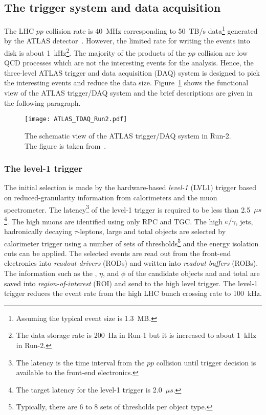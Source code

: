 
\subsection{The trigger system and data acquisition}
\label{subsec:ae_trigger}
The LHC $pp$ collision rate is 40~MHz corresponding to 50~TB/s data\footnote{Assuming the typical event size is 1.3~MB.} generated by the ATLAS detector~\cite{Kordas:2007zz}.
However, the limited rate for writing the events into disk is about 1~kHz\footnote{The data storage rate is 200~Hz in Run-1 but it is increased to about 1~kHz in Run-2.}.
The majority of the products of the $pp$ collision are low \pt QCD processes which are not the interesting events for the analysis.  
Hence, the three-level ATLAS trigger and data acquisition (DAQ) system is designed to pick the interesting events and reduce the data size.
Figure~\ref{fig:ae_tdaq} shows the functional view of the ATLAS trigger/DAQ system and the brief descriptions are given in the following paragraph.

\begin{figure}[htbp]
\begin{center}
\texttt{[image: ATLAS\_TDAQ\_Run2.pdf]}
\caption{The schematic view of the ATLAS trigger/DAQ system in Run-2.
The figure is taken from~\cite{Martinez:2016udm}.}
\label{fig:ae_tdaq}
\end{center}
\end{figure}


\subsubsection{The level-1 trigger}
\label{subsubsec:ae_LVL1}
The initial selection is made by the hardware-based \textit{level-1} (LVL1) trigger based on reduced-granularity information from calorimeters and the muon spectrometer.
The latency\footnote{The latency is the time interval from the $pp$ collision until trigger decision is available to the front-end electronics.} of the level-1 trigger is required to be less than 2.5~$\mu s$\footnote{The target latency for the level-1 trigger is 2.0~$\mu s$.}.
The high \pt muons are identified using only RPC and TGC.
The high \pt $e/\gamma$, jets, hadronically decaying $\tau$-leptons, large \met and total \et objects are selected by calorimeter trigger using a number of sets of \pt thresholds\footnote{Typically, there are 6 to 8 sets of thresholds per object type.} and the energy isolation cuts can be applied. 
The selected events are read out from the front-end electronics into \textit{readout drivers} (RODs) and written into \textit{readout buffers} (ROBs).
The information such as the \pt, $\eta$, and $\phi$ of the candidate objects and \met and total \et are saved into \textit{region-of-interest} (ROI) and send to the high level trigger.
The level-1 trigger reduces the event rate from the high LHC bunch crossing rate to 100~kHz.

